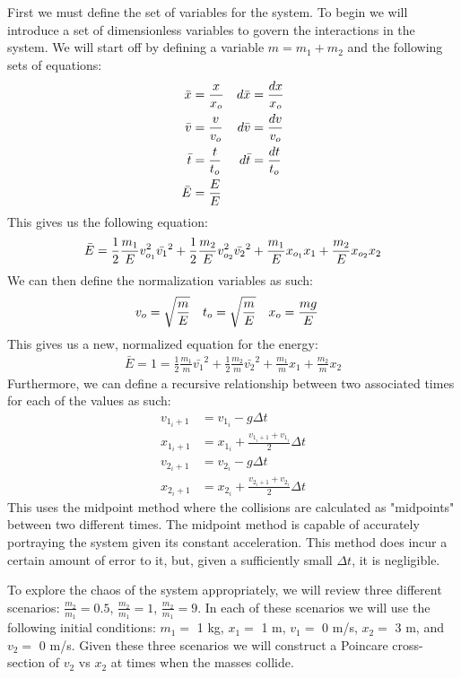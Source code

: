 \documentclass[pra,twocolumn,showpacs,amsmath,amssymb]{revtex4-2}
\begin{document}
First we must define the set of variables for the system. To begin we will introduce a set of dimensionless variables to govern the interactions in the system. We will start off by defining a variable \(m = m_1 + m_2\) and the following sets of equations:
\begin{align}
\bar{x} &= \frac{x}{x_o} & d\bar{x} &= \frac{dx}{x_o} \notag \\
\bar{v} &= \frac{v}{v_o} & d\bar{v} &= \frac{dv}{v_o} \notag \\
\bar{t} &= \frac{t}{t_o} & d\bar{t} &= \frac{dt}{t_o} \notag \\
\bar{E} &= \frac{E}{E} \notag
\end{align}
This gives us the following equation:
\begin{align}
    \bar{E} = \frac{1}{2} \frac{m_1}{E} v_{o_1}^2 \bar{v_1}^2 + \frac{1}{2} \frac{m_2}{E} v_{o_2}^2\bar{v_2}^2 + \frac{m_1}{E} x_{o_1} x_1 + \frac{m_2}{E} x_{o_2} x_2 \notag
\end{align}
We can then define the normalization variables as such:
\begin{align}
v_o &= \sqrt{\frac{m}{E}} & t_o &= \sqrt{\frac{m}{E}} & x_o &= \frac{mg}{E} \notag
\end{align}
This gives us a new, normalized equation for the energy:
\begin{align}
\bar{E} = 1 = \frac{1}{2} \frac{m_1}{m} \bar{v_1}^2 + \frac{1}{2} \frac{m_2}{m} \bar{v_2}^2 + \frac{m_1}{m} x_1 + \frac{m_2}{m} x_2
\end{align}
Furthermore, we can define a recursive relationship between two associated times for each of the values as such:
\begin{align}
v_{1_i+1} &= v_{1_i} - g \Delta t\\
x_{1_i+1} &= x_{1_i} + \frac{v_{1_i+1} + v_{1_i}}{2} \Delta t\\
v_{2_i+1} &= v_{2_i} - g \Delta t\\
x_{2_i+1} &= x_{2_i} + \frac{v_{2_i+1} + v_{2_i}}{2} \Delta t
\end{align}
This uses the midpoint method where the collisions are calculated as "midpoints" between two different times. The midpoint method is capable of accurately portraying the system given its constant acceleration. This method does incur a certain amount of error to it, but, given a sufficiently small \(\Delta t\), it is negligible.
\par To explore the chaos of the system appropriately, we will review three different scenarios: \(\frac{m_2}{m_1} = 0.5\), \(\frac{m_2}{m_1} = 1\), \(\frac{m_2}{m_1} = 9\). In each of these scenarios we will use the following initial conditions: \(m_1 =\) 1 kg, \(x_1 =\) 1 m, \(v_1 =\) 0 m/s, \(x_2 =\) 3 m, and \(v_2 =\) 0 m/s. Given these three scenarios we will construct a Poincare cross-section of \(v_2\) vs \(x_2\) at times when the masses collide.
\end{document}
